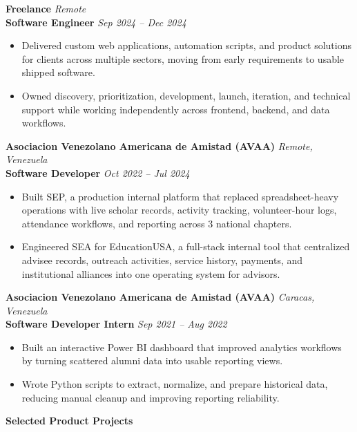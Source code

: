 \documentclass[11pt]{article}
\begin{document}
\vspace{10pt}
\textbf{Freelance} \hfill \textit{Remote} \\
\textbf{Software Engineer} \hfill \textit{Sep 2024 -- Dec 2024}
\begin{itemize}
    \item Delivered custom web applications, automation scripts, and product solutions for clients across multiple sectors, moving from early requirements to usable shipped software.
    \item Owned discovery, prioritization, development, launch, iteration, and technical support while working independently across frontend, backend, and data workflows.
\end{itemize}

\vspace{10pt}
\textbf{Asociacion Venezolano Americana de Amistad (AVAA)} \hfill \textit{Remote, Venezuela} \\
\textbf{Software Developer} \hfill \textit{Oct 2022 -- Jul 2024}
\begin{itemize}
    \item Built SEP, a production internal platform that replaced spreadsheet-heavy operations with live scholar records, activity tracking, volunteer-hour logs, attendance workflows, and reporting across 3 national chapters.
    \item Engineered SEA for EducationUSA, a full-stack internal tool that centralized advisee records, outreach activities, service history, payments, and institutional alliances into one operating system for advisors.
\end{itemize}

\vspace{10pt}
\textbf{Asociacion Venezolano Americana de Amistad (AVAA)} \hfill \textit{Caracas, Venezuela} \\
\textbf{Software Developer Intern} \hfill \textit{Sep 2021 -- Aug 2022}
\begin{itemize}
    \item Built an interactive Power BI dashboard that improved analytics workflows by turning scattered alumni data into usable reporting views.
    \item Wrote Python scripts to extract, normalize, and prepare historical data, reducing manual cleanup and improving reporting reliability.
\end{itemize}

\vspace{8pt}
\begin{center}
    \textbf{Selected Product Projects}
\end{center}
\vspace{-4pt}
\end{document}
